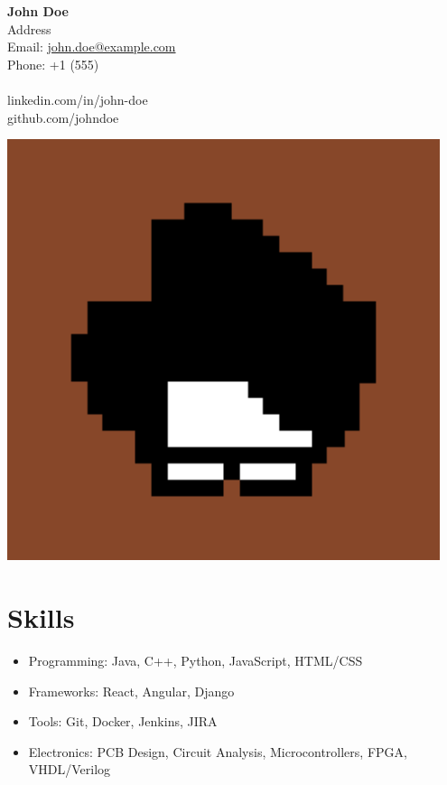 \documentclass[a4paper,12pt]{article} %
\begin{document}
\noindent
\begin{minipage}[c]{0.6\textwidth}
    {\LARGE \bfseries John Doe}\\
    Address\\
    Email: \href{mailto:john.doe@example.com}{john.doe@example.com}\\
    Phone: +1 (555)\\
    \bigskip\\
    linkedin.com/in/john-doe\\
    github.com/johndoe
\end{minipage}
\hfill
\begin{minipage}[c]{0.3\textwidth}
    \includegraphics[width=0.95\textwidth]{../resources/photo.jpg}
\end{minipage}

\section*{Skills}
\begin{itemize}[leftmargin=*]
    \item Programming: Java, C++, Python, JavaScript, HTML/CSS
    \item Frameworks: React, Angular, Django
    \item Tools: Git, Docker, Jenkins, JIRA
    \item Electronics: PCB Design, Circuit Analysis, Microcontrollers, FPGA, VHDL/Verilog
\end{itemize}
\end{document}
